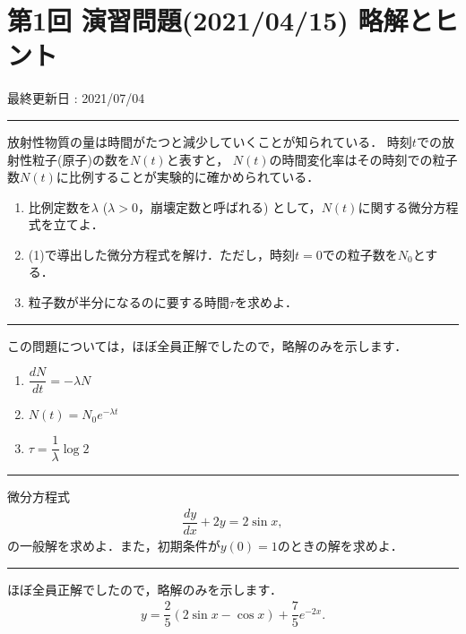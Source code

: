 \documentclass[11pt,a4]{jsarticle}
\numberwithin{equation}{section}
\begin{document}
\section*{第1回 演習問題(2021/04/15) 略解とヒント}
\begin{flushright}
  最終更新日 : 2021/07/04 
\end{flushright}
%
\hrule
\vspace*{.2cm}
\enshu
放射性物質の量は時間がたつと減少していくことが知られている．
時刻$t$での放射性粒子(原子)の数を$N(t)$と表すと，
$N(t)$の時間変化率はその時刻での粒子数$N(t)$に比例することが実験的に確かめられている．
\begin{enumerate}[(1)]
  \item 比例定数を$\lambda$ ($\lambda>0$，崩壊定数と呼ばれる) として，$N(t)$に関する微分方程式を立てよ．
  \item (1)で導出した微分方程式を解け．ただし，時刻$t=0$での粒子数を$N_0$とする．
  \item 粒子数が半分になるのに要する時間$\tau$を求めよ．
\end{enumerate}
\hrule
\vspace*{.2cm}

\setcounter{section}{1}
\noindent

この問題については，ほぼ全員正解でしたので，略解のみを示します．
\begin{enumerate}[(1)]
  \item $\dfrac{dN}{dt} = -\lambda N$
  \item $N(t) = N_{0}e^{-\lambda t}$
  \item $\tau = \dfrac{1}{\lambda} \log 2 $ 
\end{enumerate}
%
\newpage
\hrule
\vspace*{.2cm}
\enshu
微分方程式
\begin{align*}
  \dfrac{dy}{dx} + 2y = 2\sin x, 
\end{align*}
の一般解を求めよ．また，初期条件が$y(0)=1$のときの解を求めよ．
\vspace*{.2cm}
\hrule
\vspace*{.2cm}

ほぼ全員正解でしたので，略解のみを示します．
\begin{align*}
  y = \dfrac{2}{5}\left(2\sin x - \cos x\right)  + \dfrac{7}{5}e^{-2x}.
\end{align*}
\end{document}
